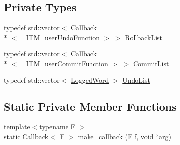 \subsection*{Private Types}
\begin{DoxyCompactItemize}
\item 
typedef std\-::vector$<$ \hyperlink{structitm2stm_1_1Scope_1_1Callback}{Callback}\\*
$<$ \hyperlink{libitm_8h_ab839c16357d3c2a1b04f7a286bf476d1}{\-\_\-\-I\-T\-M\-\_\-user\-Undo\-Function} $>$ $>$ \hyperlink{classitm2stm_1_1Scope_af1a9d57c58c4dddb4f5d95f769e749d9}{Rollback\-List}
\item 
typedef std\-::vector$<$ \hyperlink{structitm2stm_1_1Scope_1_1Callback}{Callback}\\*
$<$ \hyperlink{libitm_8h_ac19d9bbf121b4c401cbf3603a681aa0c}{\-\_\-\-I\-T\-M\-\_\-user\-Commit\-Function} $>$ $>$ \hyperlink{classitm2stm_1_1Scope_ae7aad983e4d918844dae194d2eb98421}{Commit\-List}
\item 
typedef std\-::vector$<$ \hyperlink{structitm2stm_1_1Scope_1_1LoggedWord}{Logged\-Word} $>$ \hyperlink{classitm2stm_1_1Scope_ab1ab8ebc4445367bfdccc48aa487cfab}{Undo\-List}
\end{DoxyCompactItemize}
\subsection*{Static Private Member Functions}
\begin{DoxyCompactItemize}
\item 
{\footnotesize template$<$typename F $>$ }\\static \hyperlink{structitm2stm_1_1Scope_1_1Callback}{Callback}$<$ F $>$ \hyperlink{classitm2stm_1_1Scope_a222730c2d972ee62aeaa2b4c9f1c3f2b}{make\-\_\-callback} (F f, void $\ast$\hyperlink{structarg}{arg})
\end{DoxyCompactItemize}
